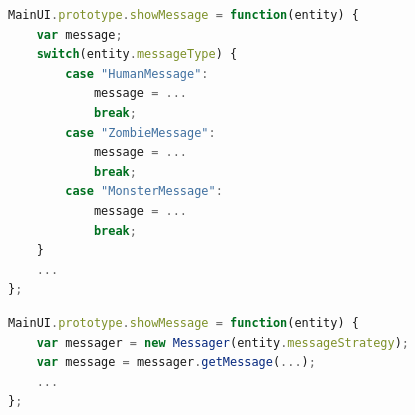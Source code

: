 \documentclass[conference, a4paper]{IEEEtran}
\begin{document}
\clearpage
\appendix

\begin{lstlisting}[language=JavaScript, label=lst:switch-case, caption=\texttt{MainUI.js} The original switch case.]
MainUI.prototype.showMessage = function(entity) {
	var message;
	switch(entity.messageType) {
		case "HumanMessage":
			message = ...
			break;
		case "ZombieMessage":
			message = ...
			break;
		case "MonsterMessage":
			message = ...
			break;
	}
	...
};
\end{lstlisting}

\begin{lstlisting}[language=JavaScript, label=lst:strategy, caption=\texttt{MainUI.js} Switch case replaced trough the Strategy pattern.]
MainUI.prototype.showMessage = function(entity) {
	var messager = new Messager(entity.messageStrategy);
	var message = messager.getMessage(...);
	...
};
\end{lstlisting}
\end{document}
